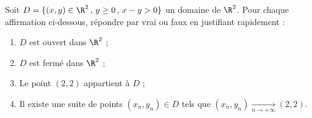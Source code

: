\titre{}
\auteur{}

Soit $D = \{(x,y) \in \R^2 \, , \, y \geq 0 \, , \, x-y > 0\}$ un domaine de $\R^2$.  Pour chaque affirmation ci-dessous, répondre par vrai ou faux en justifiant rapidement :
\begin{enumerate}
	\item $D$ est ouvert dans $\R^2$ ;
	\item $D$ est fermé dans $\R^2$ ;
	\item Le point $(2,2)$ appartient à $D$ ;
	\item Il existe une suite de points $(x_n,y_n) \in D$ tels que $(x_n,y_n) \xrightarrow[n \to +\infty]{} (2,2)$.
\end{enumerate}
